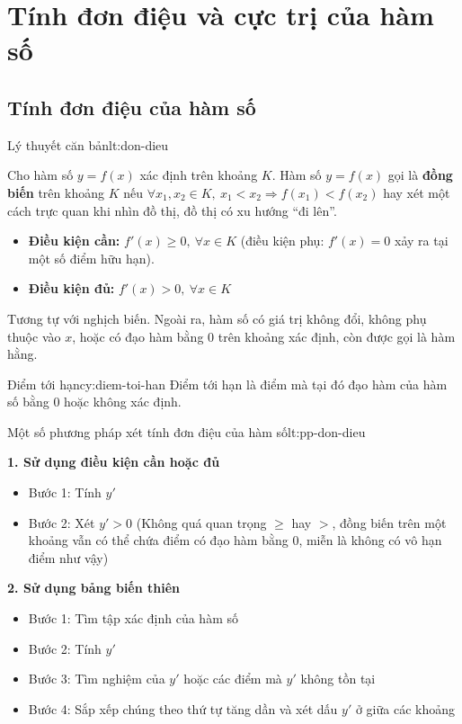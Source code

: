 \chapter{Tính đơn điệu và cực trị của hàm số}
\label{ch:chapter-1}

\section{Tính đơn điệu của hàm số}

\begin{lythuyetbox}{Lý thuyết căn bản}{lt:don-dieu}

Cho hàm số $y = f(x)$ xác định trên khoảng $K$.
Hàm số $y = f(x)$ gọi là \textbf{đồng biến} trên khoảng $K$ nếu $\forall x_1, x_2 \in K,\ x_1 < x_2 \Rightarrow f(x_1) < f(x_2)$ hay xét một cách trực quan khi nhìn đồ thị, đồ thị có xu hướng “đi lên”.

\begin{itemize}
    \item \textbf{Điều kiện cần:} $f'(x) \geq 0,\ \forall x \in K$ (điều kiện phụ: $f'(x) = 0$ xảy ra tại một số điểm hữu hạn).
    \item \textbf{Điều kiện đủ:} $f'(x) > 0,\ \forall x \in K$
\end{itemize}

Tương tự với nghịch biến. Ngoài ra, hàm số có giá trị không đổi, không phụ thuộc vào $x$, hoặc có đạo hàm bằng 0 trên khoảng xác định, còn được gọi là hàm hằng.

\begin{chuy}{Điểm tới hạn}{cy:diem-toi-han}
    Điểm tới hạn là điểm mà tại đó đạo hàm của hàm số bằng 0 hoặc không xác định.
\end{chuy}

\end{lythuyetbox}

\begin{lythuyetbox}{Một số phương pháp xét tính đơn điệu của hàm số}{lt:pp-don-dieu}

\textbf{1. Sử dụng điều kiện cần hoặc đủ}

\begin{itemize}
    \item Bước 1: Tính $y'$
    \item Bước 2: Xét $y' > 0$ (Không quá quan trọng $\geq$ hay $>$, đồng biến trên một khoảng vẫn có thể chứa điểm có đạo hàm bằng 0, miễn là không có vô hạn điểm như vậy)
\end{itemize}

\textbf{2. Sử dụng bảng biến thiên}

\begin{itemize}
    \item Bước 1: Tìm tập xác định của hàm số
    \item Bước 2: Tính $y'$
    \item Bước 3: Tìm nghiệm của $y'$ hoặc các điểm mà $y'$ không tồn tại
    \item Bước 4: Sắp xếp chúng theo thứ tự tăng dần và xét dấu $y'$ ở giữa các khoảng
\end{itemize}

\end{lythuyetbox}

